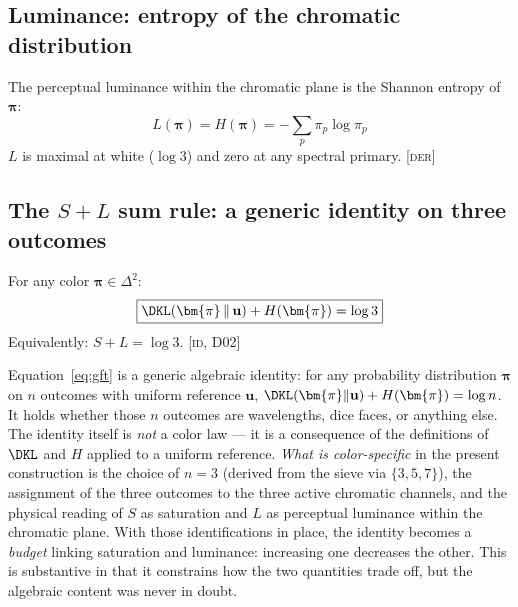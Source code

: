 \documentclass[12pt,a4paper]{article}
\begin{document}
\subsection{Luminance: entropy of the chromatic distribution}

\begin{derivedbox}
The perceptual luminance within the chromatic plane is the Shannon
entropy of $\bm{\pi}$:
\begin{equation}
  L(\bm{\pi}) = H(\bm{\pi}) = -\sum_{p} \pi_p \log \pi_p
  \label{eq:luminance}
\end{equation}
$L$ is maximal at white ($\log 3$) and zero at any spectral primary.
\textsc{[der]}
\end{derivedbox}

\subsection{The $S + L$ sum rule: a generic identity on three outcomes}

\begin{identitybox}
For any color $\bm{\pi} \in \Delta^2$:
\begin{equation}
  \boxed{\DKL(\bm{\pi} \,\|\, \mathbf{u}) + H(\bm{\pi}) = \log 3}
  \label{eq:gft}
\end{equation}
Equivalently: $S + L = \log 3$. \textsc{[id, D02]}
\end{identitybox}

\begin{remark}
Equation~\eqref{eq:gft} is a generic algebraic identity: for any
probability distribution $\bm{\pi}$ on $n$ outcomes with uniform
reference $\mathbf{u}$,
$\DKL(\bm{\pi}\|\mathbf{u}) + H(\bm{\pi}) = \log n$. It holds whether
those $n$ outcomes are wavelengths, dice faces, or anything else. The
identity itself is \emph{not} a color law --- it is a consequence of
the definitions of $\DKL$ and $H$ applied to a uniform reference.
\emph{What is color-specific} in the present construction is the
choice of $n = 3$ (derived from the sieve via $\{3,5,7\}$), the
assignment of the three outcomes to the three active chromatic
channels, and the physical reading of $S$ as saturation and $L$ as
perceptual luminance within the chromatic plane. With those
identifications in place, the identity becomes a \emph{budget} linking
saturation and luminance: increasing one decreases the other. This is
substantive in that it constrains how the two quantities trade off,
but the algebraic content was never in doubt.
\end{remark}
\end{document}
